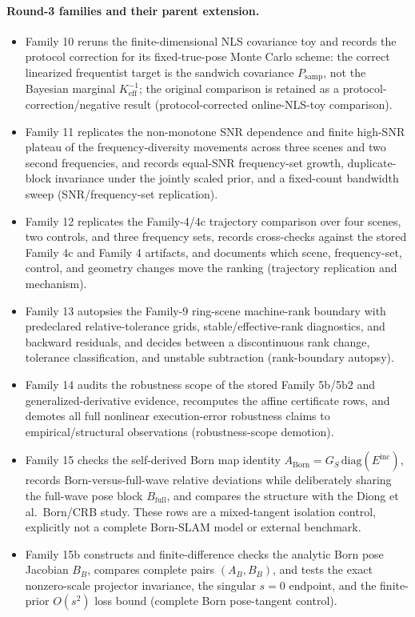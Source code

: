 \documentclass[12pt]{article}
\begin{document}
\paragraph{Round-3 families and their parent extension.}
\begin{itemize}
\item Family 10 reruns the finite-dimensional NLS covariance toy and records
the protocol correction for its fixed-true-pose Monte Carlo scheme: the
correct linearized frequentist target is the sandwich covariance
$P_{\mathrm{samp}}$, not the Bayesian marginal $K_{\mathrm{eff}}^{-1}$; the
original comparison is retained as a protocol-correction/negative result
(protocol-corrected online-NLS-toy comparison).
\item Family 11 replicates the non-monotone SNR dependence and finite
high-SNR plateau of the frequency-diversity movements across three scenes and
two second frequencies, and records equal-SNR frequency-set growth,
duplicate-block invariance under the jointly scaled prior, and a
fixed-count bandwidth sweep (SNR/frequency-set replication).
\item Family 12 replicates the Family-4/4c trajectory comparison over four
scenes, two controls, and three frequency sets, records cross-checks against
the stored Family 4c and Family 4 artifacts, and documents which scene,
frequency-set, control, and geometry changes move the ranking (trajectory
replication and mechanism).
\item Family 13 autopsies the Family-9 ring-scene machine-rank boundary with
predeclared relative-tolerance grids, stable/effective-rank diagnostics, and
backward residuals, and decides between a discontinuous rank change,
tolerance classification, and unstable subtraction (rank-boundary autopsy).
\item Family 14 audits the robustness scope of the stored Family 5b/5b2 and
generalized-derivative evidence, recomputes the affine certificate rows, and
demotes all full nonlinear execution-error robustness claims to
empirical/structural observations (robustness-scope demotion).
\item Family 15 checks the self-derived Born map identity
$A_{\mathrm{Born}}=G_S\,\mathrm{diag}(E^{\mathrm{inc}})$, records
Born-versus-full-wave relative deviations while deliberately sharing the
full-wave pose block $B_{\mathrm{full}}$, and compares the structure with the
Diong et al.\ Born/CRB study. These rows are a mixed-tangent isolation
control, explicitly not a complete Born-SLAM model or external benchmark.
\item Family 15b constructs and finite-difference checks the analytic Born pose
Jacobian $B_B$, compares complete pairs $(A_B,B_B)$, and tests the exact
nonzero-scale projector invariance, the singular $s=0$ endpoint, and the
finite-prior $O(s^2)$ loss bound (complete Born pose-tangent control).
\end{itemize}
\end{document}
